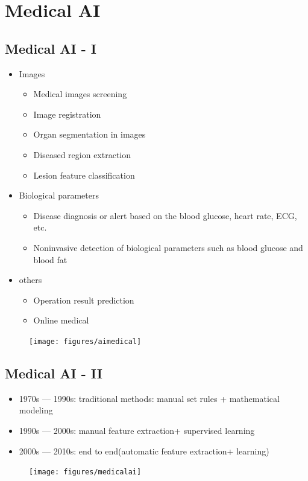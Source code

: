 \section{Medical AI}
\subsection{Medical AI - I }
\begin{itemize}
\item Images
\begin{itemize}
\item Medical images screening
\item Image registration
\item Organ segmentation in images
\item Diseased region extraction
\item Lesion feature classification
\end{itemize}

\item Biological parameters
\begin{itemize}
\item Disease diagnosis or alert based on the blood glucose, heart rate, ECG, etc.
\item Noninvasive detection of biological parameters such as blood glucose and blood fat
\end{itemize}

\item others
\begin{itemize}
\item Operation result prediction
\item Online medical
\end{itemize}

\end{itemize}

\begin{figure}[H]
\centering
\texttt{[image: figures/aimedical]} 
\end{figure}

\subsection{Medical AI - II}
\begin{itemize}
\item 1970s --- 1990s: traditional methods: manual set rules + mathematical modeling
\item 1990s --- 2000s: manual feature extraction+ supervised learning
\item 2000s --- 2010s:  end to end(automatic feature extraction+ learning)
\end{itemize}
\begin{figure}[H]
\centering
\texttt{[image: figures/medicalai]}
\end{figure}

